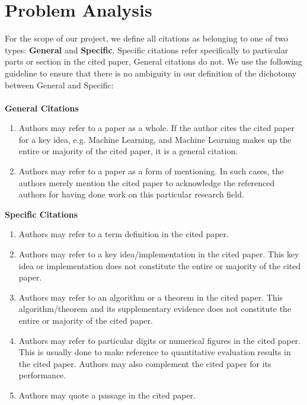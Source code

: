 \chapter{Problem Analysis}
\label{problemanalysis}

For the scope of our project, we define all citations as belonging to one of two types: \textbf{General} and \textbf{Specific}. 
Specific citations refer specifically to particular parts or section in the cited paper, General citations do not.
We use the following guideline to ensure that there is no ambiguity in our definition of the dichotomy between General and Specific: \\ \\
\textbf{General Citations}
\begin{enumerate}
\item Authors may refer to a paper as a whole. If the author cites the cited paper for a key idea, e.g. Machine Learning, and Machine Learning makes up the entire or majority of the cited paper, it is a general citation.
\item Authors may refer to a paper as a form of mentioning. In such cases, the authors merely mention the cited paper to acknowledge the referenced authors for having done work on this particular research field.
\end{enumerate}
\textbf{Specific Citations}
\begin{enumerate}
\item Authors may refer to a term definition in the cited paper.
\item Authors may refer to a key idea/implementation in the cited paper. This key idea or implementation does not constitute the entire or majority of the cited paper.
\item Authors may refer to an algorithm or a theorem in the cited paper. This algorithm/theorem and its supplementary evidence does not constitute the entire or majority of the cited paper.
\item Authors may refer to particular digits or numerical figures in the cited paper. This is usually done to make reference to quantitative evaluation results in the cited paper. Authors may also complement the cited paper for its performance.
\item Authors may quote a passage in the cited paper.
\end{enumerate}

